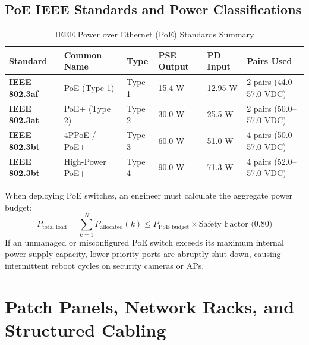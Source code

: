\subsection{PoE IEEE Standards and Power Classifications}
\begin{table}[H]
\centering
\small
{}
\begin{tabularx}{\linewidth}{l l l l l X}
\toprule
\rowcolor{tableheadercolor}
\textbf{Standard} & \textbf{Common Name} & \textbf{Type} & \textbf{PSE Output} & \textbf{PD Input} & \textbf{Pairs Used} \\
\midrule
\textbf{IEEE 802.3af} & PoE (Type 1) & Type 1 & 15.4 W & 12.95 W & 2 pairs (44.0--57.0 VDC) \\
\textbf{IEEE 802.3at} & PoE+ (Type 2) & Type 2 & 30.0 W & 25.5 W & 2 pairs (50.0--57.0 VDC) \\
\textbf{IEEE 802.3bt} & 4PPoE / PoE++ & Type 3 & 60.0 W & 51.0 W & 4 pairs (50.0--57.0 VDC) \\
\textbf{IEEE 802.3bt} & High-Power PoE++ & Type 4 & 90.0 W & 71.3 W & 4 pairs (52.0--57.0 VDC) \\
\bottomrule
\end{tabularx}
\caption{IEEE Power over Ethernet (PoE) Standards Summary}
\end{table}

\begin{examtip}
When deploying PoE switches, an engineer must calculate the aggregate power budget:
\[
P_{\text{total\_load}} = \sum_{k=1}^{N} P_{\text{allocated}}(k) \le P_{\text{PSE\_budget}} \times \text{Safety Factor (0.80)}
\]
If an unmanaged or misconfigured PoE switch exceeds its maximum internal power supply capacity, lower-priority ports are abruptly shut down, causing intermittent reboot cycles on security cameras or APs.
\end{examtip}

\section{Patch Panels, Network Racks, and Structured Cabling}


